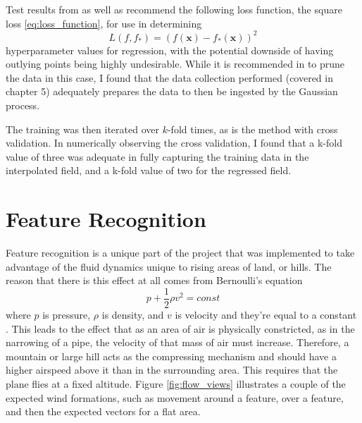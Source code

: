 \documentclass[12pt]{report}
\begin{document}
Test results from \cite{Rasmussen06} as well as \cite{Krause10} recommend the following loss function, the square loss \ref{eq:loss_function}, for use in determining 
\begin{equation}
	L(f,f_*) = (f(\boldsymbol{x})-f_*(\boldsymbol{x}))^2
	\label{eq:loss_function}
\end{equation}
hyperparameter values for regression, with the potential downside of having outlying points being highly undesirable. While it is recommended in \cite{Krause10} to prune the data in this case, I found that the data collection performed (covered in chapter 5) adequately prepares the data to then be ingested by the Gaussian process.

The training was then iterated over $k$-fold times, as is the method with cross validation. In numerically observing the cross validation, I found that a k-fold value of three was adequate in fully capturing the training data in the interpolated field, and a k-fold value of two for the regressed field. 

\section{Feature Recognition}
Feature recognition is a unique part of the project that was implemented to take advantage of the fluid dynamics unique to rising areas of land, or hills. The reason that there is this effect at all comes from Bernoulli's equation
\begin{equation} \label{eq:Bernoulli}
p+\frac{1}{2}\rho v^2=const
\end{equation}
where $p$ is pressure, $\rho$ is density, and $v$ is velocity and they're equal to a constant \cite{Anderson01}. This leads to the effect that as an area of air is physically constricted, as in the narrowing of a pipe, the velocity of that mass of air must increase. Therefore, a mountain or large hill acts as the compressing mechanism and should have a higher airspeed above it than in the surrounding area. This requires that the plane flies at a fixed altitude. Figure \ref{fig:flow_views} illustrates a couple of the expected wind formations, such as movement around a feature, over a feature, and then the expected vectors for a flat area.
\end{document}
